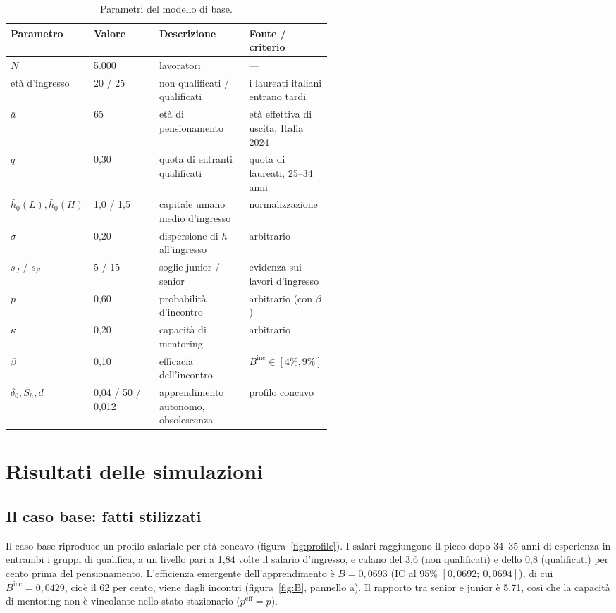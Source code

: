 \documentclass[preprint,12pt,authoryear]{elsarticle}
\begin{document}
\begin{table}[t]\centering\small
\caption{Parametri del modello di base.}\label{tab:params}
\begin{tabular}{@{}l l p{0.29\linewidth} p{0.24\linewidth}@{}}
\toprule
Parametro & Valore & Descrizione & Fonte / criterio \\
\midrule
$N$ & 5.000 & lavoratori & --- \\
età d'ingresso & 20 / 25 & non qualificati / qualificati & i laureati italiani entrano tardi \\
$\bar a$ & 65 & età di pensionamento & età effettiva di uscita, Italia 2024 \\
$q$ & 0,30 & quota di entranti qualificati & quota di laureati, 25--34 anni \\
$\bar h_0(L),\bar h_0(H)$ & 1,0 / 1,5 & capitale umano medio d'ingresso & normalizzazione \\
$\sigma$ & 0,20 & dispersione di $h$ all'ingresso & arbitrario \\
$s_J$ / $s_S$ & 5 / 15 & soglie junior / senior & evidenza sui lavori d'ingresso \\
$p$ & 0,60 & probabilità d'incontro & arbitrario (con $\beta$) \\
$\kappa$ & 0,20 & capacità di mentoring & arbitrario \\
$\beta$ & 0,10 & efficacia dell'incontro & $B^{\mathrm{inc}}\in[4\%,9\%]$ \\
$\delta_0, S_h, d$ & 0,04 / 50 / 0,012 & apprendimento autonomo, obsolescenza & profilo concavo \\
\bottomrule
\end{tabular}
\end{table}

\section{Risultati delle simulazioni}\label{sec:results}

\subsection{Il caso base: fatti stilizzati}

Il caso base riproduce un profilo salariale per età concavo (figura~\ref{fig:profile}). I salari raggiungono il picco dopo 34--35 anni di esperienza in entrambi i gruppi di qualifica, a un livello pari a 1,84 volte il salario d'ingresso, e calano del 3,6 (non qualificati) e dello 0,8 (qualificati) per cento prima del pensionamento. L'efficienza emergente dell'apprendimento è $B=0{,}0693$ (IC al 95\% $[0{,}0692;\ 0{,}0694]$), di cui $B^{\mathrm{inc}}=0{,}0429$, cioè il 62 per cento, viene dagli incontri (figura~\ref{fig:B}, pannello a). Il rapporto tra senior e junior è 5,71, così che la capacità di mentoring non è vincolante nello stato stazionario ($p^{\mathrm{eff}}=p$).
\end{document}
